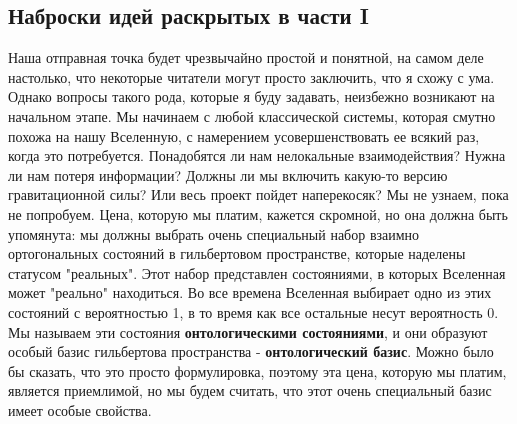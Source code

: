 \documentclass[main.tex]{subfiles}
\begin{document}
\subsection{Наброски идей раскрытых в части I}\label{ch1.2}

Наша отправная точка будет чрезвычайно простой и понятной, на самом деле настолько, что некоторые читатели могут просто заключить, что я схожу с ума. Однако вопросы такого рода, которые я буду задавать, неизбежно возникают на начальном этапе. Мы начинаем с любой классической системы, которая смутно похожа на нашу Вселенную, с намерением усовершенствовать ее всякий раз, когда это потребуется. Понадобятся ли нам нелокальные взаимодействия? Нужна ли нам потеря информации? Должны ли мы включить какую-то версию гравитационной силы? Или весь проект пойдет наперекосяк? Мы не узнаем, пока не попробуем. Цена, которую мы платим, кажется скромной, но она должна быть упомянута: мы должны выбрать очень специальный набор взаимно ортогональных состояний в гильбертовом пространстве, которые наделены статусом "реальных". Этот набор представлен состояниями, в которых Вселенная может "реально" находиться. Во все времена Вселенная выбирает одно из этих состояний с вероятностью 1, в то время как все остальные несут вероятность 0. Мы называем эти состояния \textbf{онтологическими состояниями}, и они образуют особый базис гильбертова пространства - \textbf{онтологический базис}. Можно было бы сказать, что это просто формулировка, поэтому эта цена, которую мы платим, является приемлимой, но мы будем считать, что этот очень специальный базис имеет особые свойства.
\end{document}
